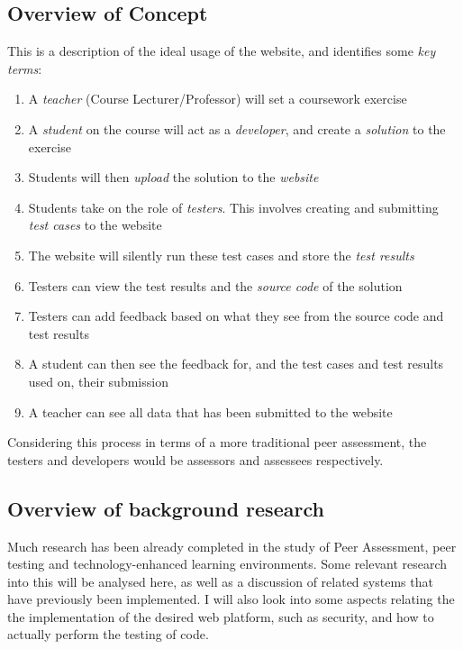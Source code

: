 \documentclass[a4paper,11pt]{report}
\begin{document}
\subsection{Overview of Concept}
This is a description of the ideal usage of the website, and identifies some \textit{key terms}:
\begin{enumerate}
 \item A \textit{teacher} (Course Lecturer/Professor) will set a coursework exercise
 \item A \textit{student} on the course will act as a \textit{developer}, and create a \textit{solution} to the exercise
 \item Students will then \textit{upload} the solution to the \textit{website}
 \item Students take on the role of \textit{testers}. This involves creating and submitting \textit{test cases} to the website
 \item The website will silently run these test cases and store the \textit{test results}
 \item Testers can view the test results and the \textit{source code} of the solution
 \item Testers can add feedback based on what they see from the source code and test results
 \item A student can then see the feedback for, and the test cases and test results used on, their submission
 \item A teacher can see all data that has been submitted to the website 
\end{enumerate}
Considering this process in terms of a more traditional peer assessment, the testers and developers would be assessors and assessees respectively.

\subsection{Overview of background research}
Much research has been already completed in the study of Peer Assessment, peer testing and technology-enhanced learning environments. Some relevant research into this will be analysed here, as well as a discussion of related systems that have previously been implemented. I will also look into some aspects relating the the implementation of the desired web platform, such as security, and how to actually perform the testing of code.

\end{document}

